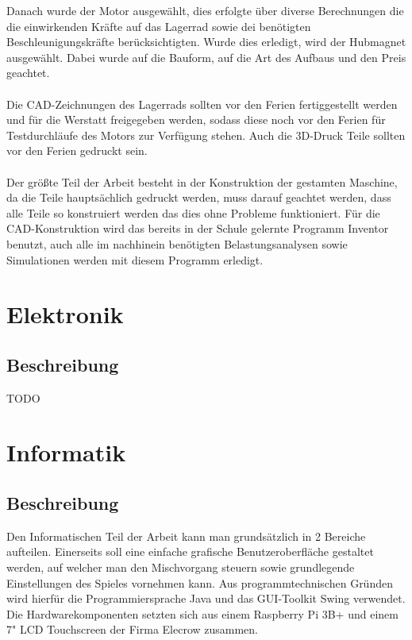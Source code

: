 Danach wurde der Motor ausgewählt, dies erfolgte über diverse Berechnungen die die einwirkenden Kräfte auf das Lagerrad sowie dei benötigten Beschleunigungskräfte berücksichtigten.
Wurde dies erledigt, wird der Hubmagnet ausgewählt. Dabei wurde auf die Bauform, auf die Art des Aufbaus und den Preis geachtet.
\\\\
Die CAD-Zeichnungen des Lagerrads sollten vor den Ferien fertiggestellt werden und für die Werstatt freigegeben werden, sodass diese noch vor den Ferien für Testdurchläufe des Motors zur Verfügung stehen.
Auch die 3D-Druck Teile sollten vor den Ferien gedruckt sein.
\\\\
Der größte Teil der Arbeit besteht in der Konstruktion der gestamten Maschine, da die Teile hauptsächlich gedruckt werden, muss darauf geachtet werden, dass alle Teile so konstruiert werden das dies ohne Probleme funktioniert.
Für die CAD-Konstruktion wird das bereits in der Schule gelernte Programm Inventor benutzt, auch alle im nachhinein benötigten Belastungsanalysen sowie Simulationen werden mit diesem Programm erledigt.


\chapter{Elektronik}
\label{sec:Elektronik}
\section{Beschreibung}

TODO



\chapter{Informatik}
\label{sec:Informatik}
\section{Beschreibung}

Den Informatischen Teil der Arbeit kann man grundsätzlich in 2 Bereiche aufteilen. Einerseits soll eine einfache grafische Benutzeroberfläche gestaltet werden, auf welcher man den Mischvorgang steuern sowie grundlegende Einstellungen des Spieles vornehmen kann.
Aus programmtechnischen Gründen wird hierfür die Programmiersprache Java und das GUI-Toolkit Swing verwendet. \\
Die Hardwarekomponenten setzten sich aus einem Raspberry Pi 3B+ und einem 7" LCD Touchscreen der Firma Elecrow zusammen. \\


